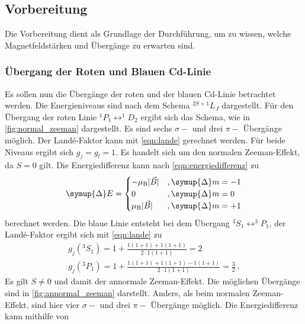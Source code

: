 \subsection{Vorbereitung}

    Die Vorbereitung dient als Grundlage der Durchführung,
    um zu wissen,
    welche Magnetfeldstärken und Übergänge zu erwarten sind.

\subsubsection{Übergang der Roten und Blauen Cd-Linie}
\label{sec:vorb_uebergaenge}

    Es sollen nun die Übergänge der roten und der blauen Cd-Linie betrachtet werden.
    Die Energieniveaus sind nach dem Schema $^{2S+1}L_J$ dargestellt.
    Für den Übergang der roten Linie $^1P_1 \leftrightarrow ^1D_2$ ergibt sich das Schema,
    wie in \autoref{fig:normal_zeeman} dargestellt.
    Es sind sechs $\sigma-$ und drei $\pi-$ Übergänge möglich.
    Der Landé-Faktor kann mit \autoref{eqn:lande} gerechnet werden.
    Für beide Niveaus ergibt sich $g_j = g_l = 1$.
    Es handelt sich um den normalen Zeeman-Effekt,
    da $S = 0$ gilt.
    Die Energiedifferenz kann nach \autoref{eqn:energiedifferenz} zu
    \begin{equation*}
        \symup{\Delta} E =
        \begin{cases}
            - \mu_\text{B} \lvert \vec{B} \rvert & , \symup{\Delta} m = -1 \\
            0 & , \symup{\Delta} m = 0 \\
            \mu_\text{B} \lvert \vec{B} \rvert & , \symup{\Delta} m = +1
        \end{cases}
    \end{equation*}
    berechnet werden.
    Die blaue Linie entsteht bei dem Übergang $^3S_1 \leftrightarrow ^3P_1$,
    der Landé-Faktor ergibt sich mit \autoref{eqn:lande} zu
    \begin{gather*}
        g_j(^3S_1) = 1 + \frac{1(1+1)+1(1+1)}{2 \cdot 1(1+1)} = 2 \\
        g_j(^3P_1) = 1 + \frac{1(1+1)+1(1+1)-1(1+1)}{2 \cdot 1(1+1)} = \frac{3}{2} \ .
    \end{gather*}
    Es gilt $S \neq 0$ und damit der annormale Zeeman-Effekt.
    Die möglichen Übergänge sind in \autoref{fig:annormal_zeeman} darstellt.
    Anders,
    als beim normalen Zeeman-Effekt,
    sind hier vier $\sigma-$ und drei $\pi-$ Übergänge möglich.
    Die Energiedifferenz kann mithilfe von
